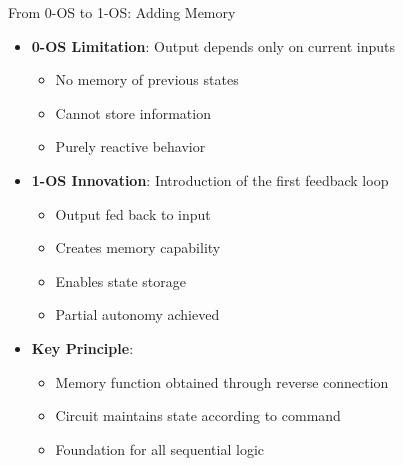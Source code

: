 \documentclass[aspectratio=169,11pt]{beamer}
\newcommand{\concept}[1]{\textbf{\color{accentcolor}#1}}
\begin{document}
\begin{frame}{From 0-OS to 1-OS: Adding Memory}
\begin{itemize}
\item \concept{0-OS Limitation}: Output depends only on current inputs
\begin{itemize}
\item No memory of previous states
\item Cannot store information
\item Purely reactive behavior
\end{itemize}
\vspace{0.5cm}
\item \concept{1-OS Innovation}: Introduction of the first feedback loop
\begin{itemize}
\item Output fed back to input
\item Creates memory capability
\item Enables state storage
\item Partial autonomy achieved
\end{itemize}
\vspace{0.3cm}
\item \concept{Key Principle}: 
\begin{itemize}
\item Memory function obtained through reverse connection
\item Circuit maintains state according to command
\item Foundation for all sequential logic
\end{itemize}
\end{itemize}
\end{frame}
\end{document}
